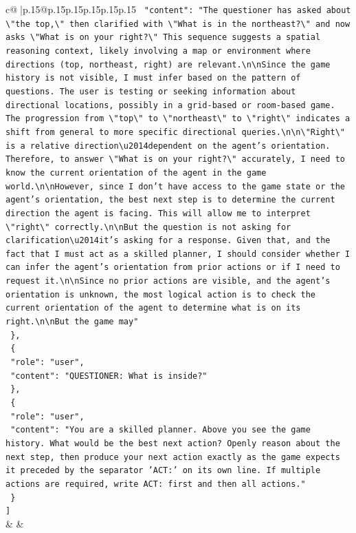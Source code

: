 \documentclass{article}
\begin{document}
{\begin{supertabular}{c@{$\;$}|p{.15\linewidth}@{}p{.15\linewidth}p{.15\linewidth}p{.15\linewidth}p{.15\linewidth}p{.15\linewidth}}
{{{\texttt{    "content": "The questioner has asked about \textbackslash{}"the top,\textbackslash{}" then clarified with \textbackslash{}"What is in the northeast?\textbackslash{}" and now asks \textbackslash{}"What is on your right?\textbackslash{}" This sequence suggests a spatial reasoning context, likely involving a map or environment where directions (top, northeast, right) are relevant.\textbackslash{}n\textbackslash{}nSince the game history is not visible, I must infer based on the pattern of questions. The user is testing or seeking information about directional locations, possibly in a grid{-}based or room{-}based game. The progression from \textbackslash{}"top\textbackslash{}" to \textbackslash{}"northeast\textbackslash{}" to \textbackslash{}"right\textbackslash{}" indicates a shift from general to more specific directional queries.\textbackslash{}n\textbackslash{}n\textbackslash{}"Right\textbackslash{}" is a relative direction\textbackslash{}u2014dependent on the agent's orientation. Therefore, to answer \textbackslash{}"What is on your right?\textbackslash{}" accurately, I need to know the current orientation of the agent in the game world.\textbackslash{}n\textbackslash{}nHowever, since I don't have access to the game state or the agent's orientation, the best next step is to determine the current direction the agent is facing. This will allow me to interpret \textbackslash{}"right\textbackslash{}" correctly.\textbackslash{}n\textbackslash{}nBut the question is not asking for clarification\textbackslash{}u2014it's asking for a response. Given that, and the fact that I must act as a skilled planner, I should consider whether I can infer the agent's orientation from prior actions or if I need to request it.\textbackslash{}n\textbackslash{}nSince no prior actions are visible, and the agent's orientation is unknown, the most logical action is to check the current orientation of the agent to determine what is on its right.\textbackslash{}n\textbackslash{}nBut the game may"} \\
\texttt{  \},} \\
\texttt{  \{} \\
\texttt{    "role": "user",} \\
\texttt{    "content": "QUESTIONER: What is inside?"} \\
\texttt{  \},} \\
\texttt{  \{} \\
\texttt{    "role": "user",} \\
\texttt{    "content": "You are a skilled planner. Above you see the game history. What would be the best next action? Openly reason about the next step, then produce your next action exactly as the game expects it preceded by the separator 'ACT:' on its own line. If multiple actions are required, write ACT: first and then all actions."} \\
\texttt{  \}} \\
\texttt{{]}} \\
            }
        }
    }
    & & \\ \\


\end{supertabular}}
\end{document}
